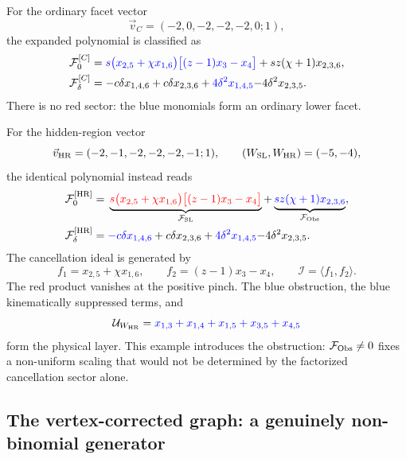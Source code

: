 \documentclass[a4paper,11pt]{article}
\newcommand{\HR}{\mathrm{HR}}
\newcommand{\FSL}{\mathcal F_{\rm SL}}
\newcommand{\FObs}{\mathcal F_{\rm Obs}}
\newcommand{\WSL}{W_{\rm SL}}
\newcommand{\WHR}{W_{\rm HR}}
\newcommand{\vHR}{\vec v_{\rm HR}}
\newcommand{\ideal}{\mathcal I}
\newcommand{\SLcolour}[1]{{\color{red}#1}}
\newcommand{\HRcolour}[1]{{\color{blue}#1}}
\newcommand{\Othercolour}[1]{{\color{black}#1}}
\begin{document}
For the ordinary facet vector
\begin{equation}
 \vec v_C=(-2,0,-2,-2,-2,0;1),
 \label{eq:five-facet-vector}
\end{equation}
the expanded polynomial is classified as
\begin{align}
 \mathcal F_0^{[C]}={}&
 \HRcolour{s\bigl(x_{2,5}+\chi x_{1,6}\bigr)
       \bigl[(z-1)x_3-x_4\bigr]}
 +\Othercolour{sz(\chi+1)x_{2,3,6}},
 \label{eq:five-facet-F0}\\
 \mathcal F_\delta^{[C]}={}&
 \Othercolour{-c\delta x_{1,4,6}+c\delta x_{2,3,6}}
 +\HRcolour{4\delta^2x_{1,4,5}}
 \Othercolour{-4\delta^2x_{2,3,5}}.
 \label{eq:five-facet-Fdelta}
\end{align}
There is no red sector: the blue monomials form an ordinary lower facet.

For the hidden-region vector
\begin{equation}
 \vHR=(-2,-1,-2,-2,-2,-1;1),
 \qquad (\WSL,\WHR)=(-5,-4),
 \label{eq:five-HR-vector}
\end{equation}
the identical polynomial instead reads
\begin{align}
 \mathcal F_0^{[\HR]}={}&
 \underbrace{\SLcolour{s\bigl(x_{2,5}+\chi x_{1,6}\bigr)
       \bigl[(z-1)x_3-x_4\bigr]}}_{\FSL}
 +\underbrace{\HRcolour{sz(\chi+1)x_{2,3,6}}}_{\FObs},
 \label{eq:five-HR-F0}\\
 \mathcal F_\delta^{[\HR]}={}&
 \HRcolour{-c\delta x_{1,4,6}}
 +\Othercolour{c\delta x_{2,3,6}}
 +\HRcolour{4\delta^2x_{1,4,5}}
 \Othercolour{-4\delta^2x_{2,3,5}}.
 \label{eq:five-HR-Fdelta}
\end{align}
The cancellation ideal is generated by
\begin{equation}
 f_1=x_{2,5}+\chi x_{1,6},\qquad
 f_2=(z-1)x_3-x_4,\qquad \ideal=\langle f_1,f_2\rangle.
 \label{eq:five-generator}
\end{equation}
The red product vanishes at the positive pinch.  The blue obstruction,
the blue kinematically suppressed terms, and
\begin{equation}
 \mathcal U_{\WHR}
 =\HRcolour{x_{1,3}+x_{1,4}+x_{1,5}+x_{3,5}+x_{4,5}}
 \label{eq:five-U-leading}
\end{equation}
form the physical layer.  This example introduces the obstruction:
\(\FObs\ne0\) fixes a non-uniform scaling that would not be determined by
the factorized cancellation sector alone.

\subsection{The vertex-corrected graph: a genuinely non-binomial generator}
\end{document}
